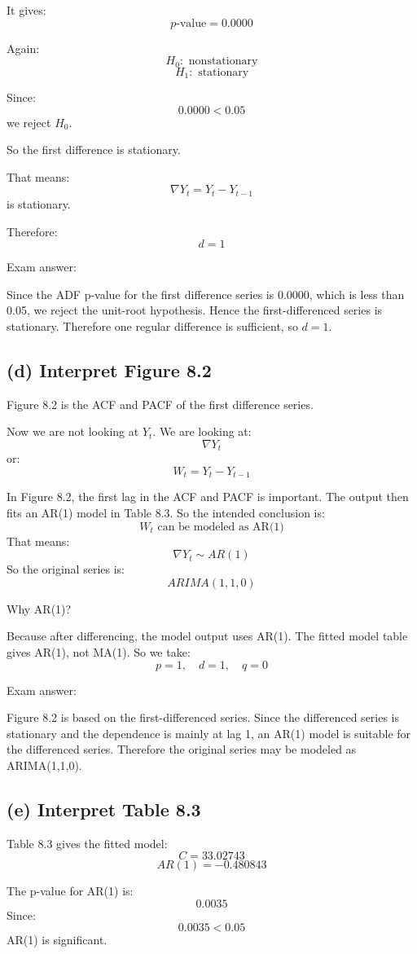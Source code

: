 \documentclass[11pt]{article}
\begin{document}
It gives:
\[
p\text{-value}=0.0000
\]

Again:
\[
H_0: \text{ nonstationary}
\]
\[
H_1: \text{ stationary}
\]

Since:
\[
0.0000<0.05
\]
we reject $H_0$.

So the first difference is stationary.

That means:
\[
\nabla Y_t = Y_t - Y_{t-1}
\]
is stationary.

Therefore:
\[
d=1
\]

Exam answer:

Since the ADF p-value for the first difference series is 0.0000, which is less than 0.05, we reject the unit-root hypothesis. Hence the first-differenced series is stationary. Therefore one regular difference is sufficient, so $d=1$.

\subsection*{(d) Interpret Figure 8.2}
Figure 8.2 is the ACF and PACF of the first difference series.

Now we are not looking at $Y_t$.
We are looking at:
\[
\nabla Y_t
\]
or:
\[
W_t = Y_t - Y_{t-1}
\]

In Figure 8.2, the first lag in the ACF and PACF is important. The output then fits an AR(1) model in Table 8.3. So the intended conclusion is:
\[
W_t \text{ can be modeled as AR(1)}
\]
That means:
\[
\nabla Y_t \sim AR(1)
\]
So the original series is:
\[
\boxed{ARIMA(1,1,0)}
\]

Why AR(1)?

Because after differencing, the model output uses AR(1). The fitted model table gives AR(1), not MA(1). So we take:
\[
p=1,\quad d=1,\quad q=0
\]

Exam answer:

Figure 8.2 is based on the first-differenced series. Since the differenced series is stationary and the dependence is mainly at lag 1, an AR(1) model is suitable for the differenced series. Therefore the original series may be modeled as ARIMA(1,1,0).

\subsection*{(e) Interpret Table 8.3}
Table 8.3 gives the fitted model:
\[
C=33.02743
\]
\[
AR(1)=-0.480843
\]

The p-value for AR(1) is:
\[
0.0035
\]
Since:
\[
0.0035<0.05
\]
AR(1) is significant.
\end{document}
